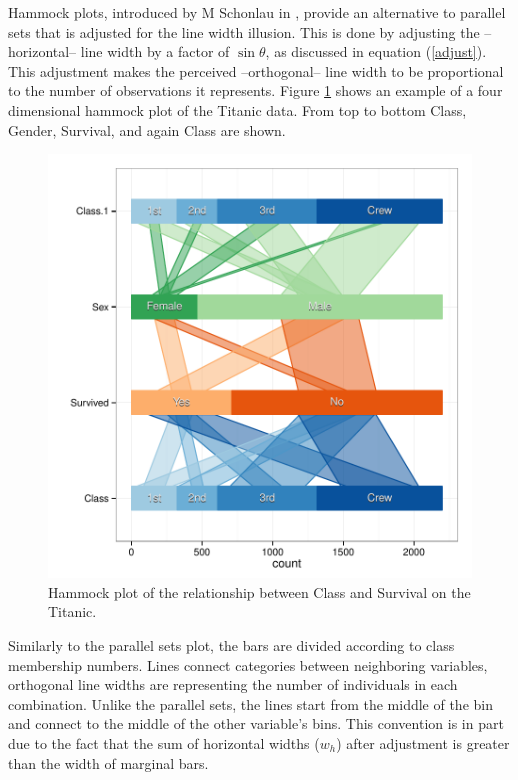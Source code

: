 \documentclass[journal]{vgtc}\usepackage{graphicx, color}
\begin{document}
Hammock plots, introduced by M Schonlau in \cite{schonlau:2003}, provide an alternative to parallel sets that is adjusted for the line width illusion. This is done by  adjusting the --horizontal-- line width by  a factor of $\sin \theta$, as discussed in equation (\ref{adjust}). This adjustment makes the perceived --orthogonal-- line width to be proportional to the number of observations it represents. 
 Figure \ref{hammock} shows an example of a four dimensional hammock plot of the Titanic data. From top to bottom Class, Gender, Survival, and again Class are shown. 
\begin{figure}
\centering
\includegraphics[width=\linewidth]{images/hammock-titanic}
\caption{\label{hammock} Hammock plot of the relationship between Class and Survival on the Titanic. }
\end{figure}

Similarly to the parallel sets plot, the bars are divided according to class membership numbers.  Lines connect categories between neighboring variables, orthogonal line widths are representing the number of individuals in each combination. Unlike the parallel sets, the lines start from the middle of the bin and connect to the middle of the other variable's bins. This convention is in part due to the fact that the sum of  horizontal widths ($w_h$) after adjustment is greater than the width of marginal bars.
\end{document}
